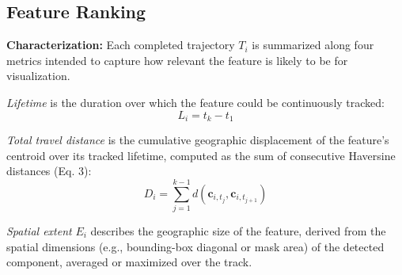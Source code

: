 \documentclass[journal abbreviation, manuscript]{copernicus}
\begin{document}
\subsection{Feature Ranking}

\textbf{Characterization:} Each completed trajectory $T_i$ is summarized along four metrics intended to capture how relevant the feature is likely to be for visualization.

\textit{Lifetime} is the duration over which the feature could be continuously tracked:
\begin{equation}
L_i = t_k - t_1
\tag{5}
\end{equation}

\textit{Total travel distance} is the cumulative geographic displacement of the feature's centroid over its tracked lifetime, computed as the sum of consecutive Haversine distances (Eq. 3):
\begin{equation}
D_i =
\sum_{j=1}^{k-1}
d\!\left(
\mathbf{c}_{i,t_j},
\mathbf{c}_{i,t_{j+1}}
\right)
\tag{6}
\end{equation}

\textit{Spatial extent} $E_i$ describes the geographic size of the feature, derived from the spatial dimensions (e.g., bounding-box diagonal or mask area) of the detected component, averaged or maximized over the track.
\end{document}
